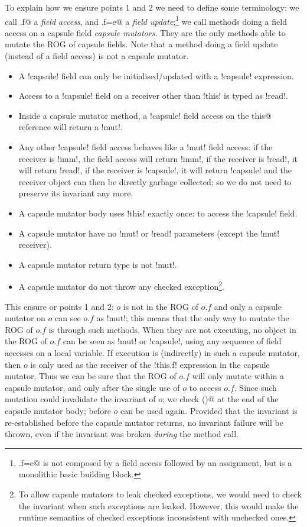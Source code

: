 To explain how we ensure points 1 and 2 we need to define some terminology:
we call \Q@x.f@ a \emph{field access}, and 
\Q@x.f=e@ a \emph{field update};\footnote{\Q@x.f=e@ is not composed by a field access followed by an assignment, but is a monolithic basic building block.}
we call \Q@mut@ methods doing a field access
on a capsule field \emph{capsule mutators}. They are the only methods able to mutate the ROG of capsule fields. Note that a method doing a \Q@capsule@ field update (instead of a field access) is not a capsule mutator.
\begin{itemize}
	\item A \Q!capsule! field can only be initialised/updated with a \Q!capsule! expression.
\item Access to a \Q!capsule! field on a receiver other than \Q!this! is typed as \Q!read!.
\item Inside a capsule mutator method,
a \Q!capsule! field access 
on the \Q@mut this@ reference will return a \Q!mut!.
\item Any other \Q!capsule! field access behaves like a \Q!mut! field access: if the receiver is \Q!imm!, the field access will return \Q!imm!, if the receiver is \Q!read!, it will return \Q!read!, if the receiver is \Q!capsule!, it will return \Q!capsule! and
the \Q@capsule@ receiver object can then be directly garbage collected; so we do not need to preserve its invariant any more.
\item A capsule mutator body uses \Q!this! exactly once: to access the \Q!capsule! field.
\item A capsule mutator have no \Q!mut! or \Q!read! parameters (except the \Q!mut! receiver).
\item A capsule mutator return type is not \Q!mut!.
\item A capsule mutator do not throw any checked exception\footnote{To allow capsule mutators to leak checked exceptions, we would need to check the invariant when such exceptions are leaked. However, this would make the runtime semantics of checked exceptions inconsistent with unchecked ones.}.
\end{itemize}	
	
\noindent This ensure or points 1 and 2:
$o$ is not in the ROG of $o.f$ and
only a capsule mutator on $o$ can see $o.f$ as \Q!mut!; this means that the only way to mutate the ROG of $o.f$ is through such methods. When they are not executing, no object in the ROG of $o.f$ can be seen as \Q!mut! or \Q!capsule!, using any sequence of field accesses on a local variable.
If execution is (indirectly) in such a capsule mutator, then $o$ is only used as the receiver of the \Q!this.f! expression in the capsule mutator.
Thus we can be sure that the ROG of $o.f$ will only mutate within a capsule mutator, and only after the single use of $o$ to access $o.f$.
Since such mutation could invalidate the invariant of $o$; we check \Q@invariant()@ at the end of the capsule mutator body; before $o$ can be used again. Provided that the invariant is re-established before the capsule mutator returns, no invariant failure will be thrown, even if the invariant was broken \emph{during} the method call.

